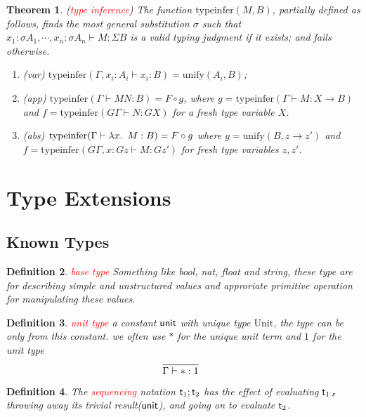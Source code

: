 \documentclass{article}
\theoremstyle{plain}
\newtheorem{theorem}{Theorem}
\newtheorem{definition}[theorem]{Definition}
\theoremstyle{nonumberplain}
\newcommand{\lam}[2]{\ensuremath{\lambda #1\ldotp~ #2}} %
\newcommand{\singletype}[1]{\text{#1}}
\newcommand{\term}[1]{\ensuremath\mathsf{#1}}
\newcommand{\seq}[2]{#1;#2}
\newcommand{\redt}[1]{\textcolor{red}{#1}}
\begin{document}
\begin{theorem}
\rm (\redt{type inference}) The function $\text{typeinfer}(M,B)$, partially defined as follows, finds the most general substitution $\sigma$ such that $x_1:\sigma A_1,\cdots,x_n:\sigma A_n \vdash M:\Sigma B$ is a valid typing judgment if it exists; and fails otherwise.
\begin{enumerate}
	\item (var) $\text{typeinfer}(\Gamma,x_i:A_i \vdash x_i:B) = \text{unify}(A_i,B)$;
	\item (app) $\text{typeinfer}(\Gamma \vdash MN:B) = F \circ g$, where $g = \text{typeinfer}(\Gamma \vdash M:X\to B)$ and $f = \text{typeinfer}(G\Gamma\vdash N:GX)$ for a fresh type variable $X$. 
	\item (abs) $\text{typeinfer}(\Gamma \vdash \lam{x}{M:B}) = F \circ g$ where $g = \text{unify}(B,z \to z')$ and $f = \text{typeinfer}(G\Gamma, x:Gz \vdash M:Gz')$ for fresh type variables $z,z'$. 
\end{enumerate}


\end{theorem}

\newpage
\section{Type Extensions}

\subsection{Known Types}

\begin{definition}
\rm \redt{base type} Something like bool, nat, float and string, these type are for describing simple and unstructured values and approriate primitive operation for manipulating these values.
\end{definition}

\begin{definition}
\rm \redt{unit type} a constant $\term{unit}$ with unique type $\singletype{Unit}$, the type can be only from this constant. we often use $*$ for the unique unit term and $1$ for the unit type
$$
\infer[]{\Gamma \vdash *:1}{}
$$
\end{definition}

\begin{definition}
\rm The \redt{sequencing} notation $\seq{\term{t}_1}{\term{t}_2}$ has the effect of evaluating $\term{t}_1$，throwing away its trivial result($\term{unit}$), and going on to evaluate $\term{t}_2$. 
\end{definition}
\end{document}
